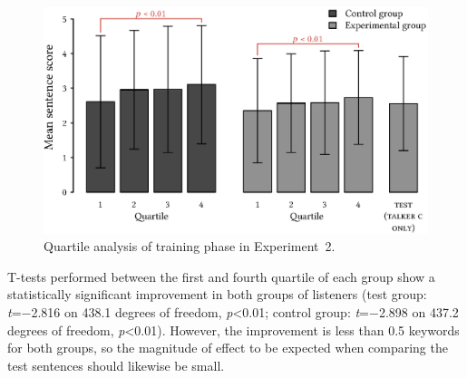\begin{figure}[htbp]
	\begin{centering}
	\includegraphics{figures/results/QuartileBarplot.eps}
	\caption[Quartile analysis of training phase in Experiment~2]{Quartile analysis of training phase in Experiment~2.\label{fig:Quartile}}
	\end{centering}
\end{figure}

T-tests performed between the first and fourth quartile of each group show a statistically significant improvement in both groups of listeners (test group: \textit{t}=−2.816 on 438.1 degrees of freedom, \textit{p}<0.01; control group: \textit{t}=−2.898 on 437.2 degrees of freedom, \textit{p}<0.01).  However, the improvement is less than 0.5 keywords for both groups, so the magnitude of effect to be expected when comparing the test sentences should likewise be small.




